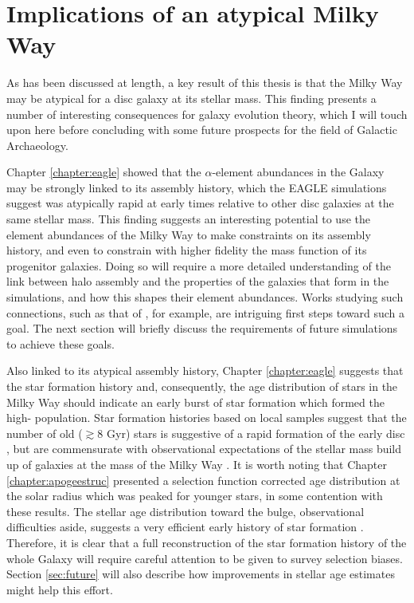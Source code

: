 \section{Implications of an atypical Milky Way}

As has been discussed at length, a key result of this thesis is that the Milky Way may be atypical for a disc galaxy at its stellar mass. This finding presents a number of interesting consequences for galaxy evolution theory, which I will touch upon here before concluding with some future prospects for the field of Galactic Archaeology. 

Chapter \ref{chapter:eagle} showed that the $\alpha$-element abundances in the Galaxy may be strongly linked to its assembly history, which the EAGLE simulations suggest was atypically rapid at early times relative to other disc galaxies at the same stellar mass. This finding suggests an interesting potential to use the element abundances of the Milky Way to make constraints on its assembly history, and even to constrain with higher fidelity the mass function of its progenitor galaxies. Doing so will require a more detailed understanding of the link between halo assembly and the properties of the galaxies that form in the simulations, and how this shapes their element abundances. Works studying such connections, such as that of \citet{2018arXiv180505956M}, for example, are intriguing first steps toward such a goal. The next section will briefly discuss the requirements of future simulations to achieve these goals.

Also linked to its atypical assembly history, Chapter \ref{chapter:eagle} suggests that the star formation history and, consequently, the age distribution of stars in the Milky Way should indicate an early burst of star formation which formed the high-\afe{} population. Star formation histories based on local samples suggest that the number of old ($\gtrsim 8$ Gyr) stars is suggestive of a rapid formation of the early disc \citep{2015A&A...578A..87S}, but are commensurate with observational expectations of the stellar mass build up of galaxies at the mass of the Milky Way \citep{2014ApJ...781L..31S}. It is worth noting that Chapter \ref{chapter:apogeestruc} presented a selection function corrected age distribution at the solar radius which was peaked for younger stars, in some contention with these results. The stellar age distribution toward the bulge, observational difficulties aside, suggests a very efficient early history of star formation \citep[e.g.][]{2018MNRAS.477.3507B}. Therefore, it is clear that a full reconstruction of the star formation history of the whole Galaxy will require careful attention to be given to survey selection biases. Section \ref{sec:future} will also describe how improvements in stellar age estimates might help this effort.

